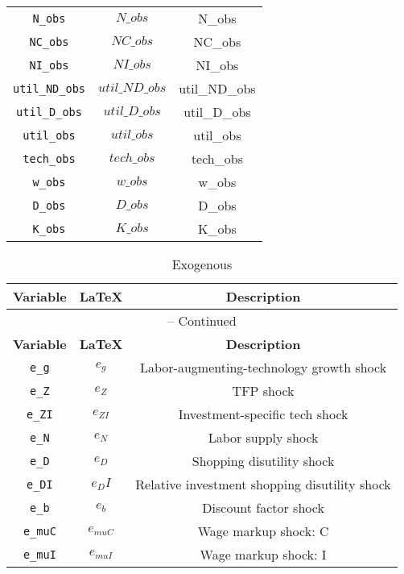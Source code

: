 \begin{center}
\begin{longtable}{ccc}
\texttt{N\_obs} & $N\_obs$ & N\_obs\\
\texttt{NC\_obs} & $NC\_obs$ & NC\_obs\\
\texttt{NI\_obs} & $NI\_obs$ & NI\_obs\\
\texttt{util\_ND\_obs} & $util\_ND\_obs$ & util\_ND\_obs\\
\texttt{util\_D\_obs} & $util\_D\_obs$ & util\_D\_obs\\
\texttt{util\_obs} & $util\_obs$ & util\_obs\\
\texttt{tech\_obs} & $tech\_obs$ & tech\_obs\\
\texttt{w\_obs} & $w\_obs$ & w\_obs\\
\texttt{D\_obs} & $D\_obs$ & D\_obs\\
\texttt{K\_obs} & $K\_obs$ & K\_obs\\
\hline%
\end{longtable}
\end{center}
\begin{center}
\begin{longtable}{ccc}
\caption{Exogenous}\\%
\hline%
\multicolumn{1}{c}{\textbf{Variable}} &
\multicolumn{1}{c}{\textbf{\LaTeX}} &
\multicolumn{1}{c}{\textbf{Description}}\\%
\hline\hline%
\endfirsthead
\multicolumn{3}{c}{{\tablename} \thetable{} -- Continued}\\%
\hline%
\multicolumn{1}{c}{\textbf{Variable}} &
\multicolumn{1}{c}{\textbf{\LaTeX}} &
\multicolumn{1}{c}{\textbf{Description}}\\%
\hline\hline%
\endhead
\texttt{e\_g} & ${e_g}$ & Labor-augmenting-technology growth shock\\
\texttt{e\_Z} & ${e_Z}$ & TFP shock\\
\texttt{e\_ZI} & ${e_{ZI}}$ & Investment-specific tech shock\\
\texttt{e\_N} & ${e_N}$ & Labor supply shock\\
\texttt{e\_D} & ${e_D}$ & Shopping disutility shock\\
\texttt{e\_DI} & ${e_DI}$ & Relative investment shopping disutility shock\\
\texttt{e\_b} & ${e_b}$ & Discount factor shock\\
\texttt{e\_muC} & ${e_{muC}}$ & Wage markup shock: C\\
\texttt{e\_muI} & ${e_{muI}}$ & Wage markup shock: I\\
\hline%
\end{longtable}
\end{center}
